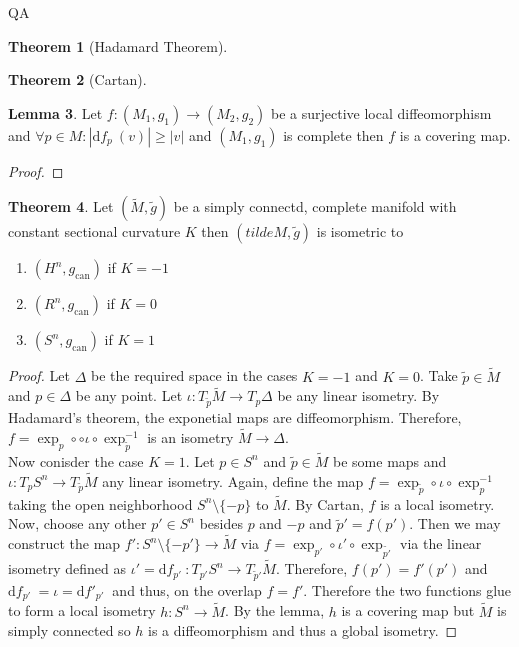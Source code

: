 QA	 \documentclass[12pt]{extarticle}
\renewcommand{\d}[1]{ \mathrm{d}#1 \:}
\theoremstyle{definition}
\newtheorem{theorem}{Theorem}[section]
\newtheorem{lemma}[theorem]{Lemma}
\begin{document}
\begin{theorem}[Hadamard Theorem]

\end{theorem}

\begin{theorem}[Cartan]

\end{theorem}


\begin{lemma}
Let $f : (M_1, g_1) \to (M_2, g_2)$ be a surjective local diffeomorphism and $\forall p \in M : |\d{f_p}(v)| \ge |v|$ and $(M_1, g_1)$ is complete then $f$ is a covering map. 
\end{lemma}

\begin{proof}

\end{proof}

\begin{theorem}
Let $(\tilde{M}, \tilde{g})$ be a simply connectd, complete manifold with constant sectional curvature $K$ then $(tilde{M}, \tilde{g})$ is isometric to
\begin{enumerate}
\item $(H^n, g_{\text{can}})$ if $K = -1$
\item $(R^n, g_{\text{can}})$ if $K = 0$
\item $(S^n, g_{\text{can}})$ if $K = 1$
\end{enumerate} 
\end{theorem}

\begin{proof}
Let $\Delta$ be the required space in the cases $K = -1$ and $K = 0$. Take $\tilde{p} \in \tilde{M}$ and $p \in \Delta$ be any point. Let $\iota : T_{\tilde{p}} \tilde{M} \to T_p \Delta$ be any linear isometry. By Hadamard's theorem, the exponetial maps are diffeomorphism. Therefore, $f = \exp_p \circ \circ \iota \circ \exp_{\tilde{p}}^{-1}$ is an isometry $\tilde{M} \to \Delta$. 
\bigskip\\
Now conisder the case $K = 1$. Let $p \in S^n$ and $\tilde{p} \in \tilde{M}$ be some maps and $\iota : T_p S^n \to T_{\tilde{p}} \tilde{M}$ any linear isometry. Again, define the map $f = \exp_{\tilde{p}} \circ \iota \circ \exp_p^{-1}$ taking the open neighborhood $S^{n} \setminus \{-p\}$ to $\tilde{M}$. By Cartan, $f$ is a local isometry. Now, choose any other $p' \in S^n$ besides $p$ and $-p$ and $\tilde{p}' = f(p')$. Then we may construct the map $f' : S^n \setminus \{ - p' \} \to \tilde{M}$ via $f = \exp_{p'} \circ \iota' \circ \exp_{\tilde{p'}}$ via the linear isometry defined as $\iota' = \d{f_{p'}} : T_{p'} S^n \to T_{\tilde{p}'} \tilde{M}$. Therefore, $f(p') = f'(p')$ and $\d{f_{p'}} = \iota = \d{f'_{p'}}$ and thus, on the overlap $f = f'$. Therefore the two functions glue to form a local isometry $h : S^n \to \tilde{M}$. By the lemma, $h$ is a covering map but $\tilde{M}$ is simply connected so $h$ is a diffeomorphism and thus a global isometry.     
\end{proof}
\end{document}
